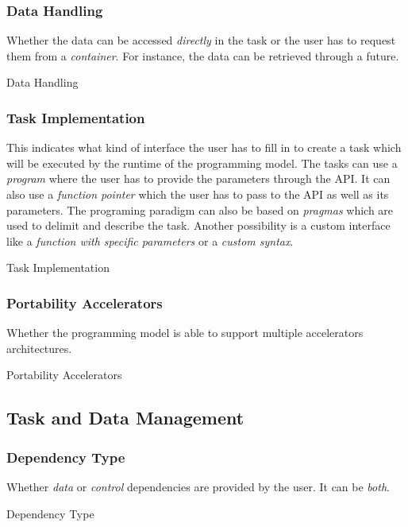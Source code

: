 \subsubsection{Data Handling}
Whether the data can be accessed \textit{directly} in the task or the user has to request them from a \textit{container}.
For instance, the data can be retrieved through a future.
\begin{table}[H]
	\caption{Data Handling}
	\centering
	
\end{table}

\subsubsection{Task Implementation}
This indicates what kind of interface the user has to fill in to create a task which will be executed by the runtime of the programming model.
The tasks can use a \textit{program} where the user has to provide the parameters through the API.
It can also use a \textit{function pointer} which the user has to pass to the API as well as its parameters.
The programing paradigm can also be based on \textit{pragmas} which are used to delimit and describe the task.
Another possibility is a custom interface like a \textit{function with specific parameters} or a \textit{custom syntax}.
\begin{table}[H]
	\caption{Task Implementation}
	\centering
	
\end{table}

\subsubsection{Portability Accelerators}
Whether the programming model is able to support multiple accelerators architectures.
\begin{table}[H]
	\caption{Portability Accelerators}
	\centering
	
\end{table}

\subsection{Task and Data Management}
\subsubsection{Dependency Type}
Whether \textit{data} or \textit{control} dependencies are provided by the user.
It can be \textit{both}.
\begin{table}[H]
	\caption{Dependency Type}
	\centering
	
\end{table}

